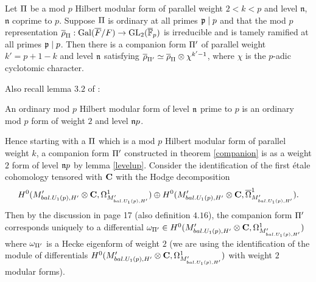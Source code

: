 \documentclass{amsart}
\newcommand{\ov}[1]{\overline{#1}}
\numberwithin{equation}{section}
\def \mb{\mbox}
\begin{document}
\begin{theorem}
\label{companion}
Let $\Pi$ be a mod $p$ Hilbert modular form of parallel weight $2<k<p$ and
level $\mathfrak{n}$, $\mathfrak{n}$ coprime to $p$. Suppose $\Pi$ is 
ordinary at all primes $\mathfrak{p} \mid p$ and that the mod $p$ representation
$\orho_\pip:\Gal(\overline{F}/F) \map \mb{GL}_{2}({\ov{\F}}_p)$ is irreducible
and is tamely ramified at all primes $\mathfrak{p} \mid p$. Then there is a 
companion form $\Pi'$ of parallel weight $k'=p+1-k$ and level $\mathfrak{n}$
satisfying $\ov{\rho}_{\pip'} \simeq \ov{\rho}_\pip \otimes \chi^{k'-1}$,
where $\chi$ is the $p$-adic cyclotomic character.
\end{theorem}

Also recall lemma $3.2$ of \cite{MR2357747}:

\begin{lemma}
\label{levelup}
An ordinary mod $p$ Hilbert modular form of level $\mathfrak{n}$ prime to $p$ is
an ordinary mod $p$ form of weight $2$ and level $\mathfrak{n}p$.
\end{lemma}

Hence starting with a $\Pi$ which is a mod $p$ Hilbert modular form of 
parallel weight $k$, a companion form $\Pi'$ constructed in theorem 
\ref{companion} is as a weight $2$ form of level $\mathfrak{n}p$ 
by lemma \ref{levelup}. 
Consider the identification of the first \'{e}tale
cohomology tensored with $\bold{C}$ with the Hodge decomposition 
$$H^0(\Mu  \otimes \bold{C},\Omega^1_{\Mu}) \oplus
H^0(\Mu \otimes \bold{C},\ov{\Omega}^1_{\Mu}).
$$
Then by the discussion in \cite{MR2357747} page 17 (also definition $4.16$), 
the companion form $\Pi'$ 
corresponds uniquely to a differential
$\omega_{\Pi'} \in H^0(M'_{bal.U_1(p),H'}  \otimes \bold{C},\Omega^1_{M'_{bal.U_1(p),H'}} )$ where
$\omega_{\Pi'}$ is a Hecke eigenform of weight $2$ (we are using the 
identification of the module of differentials 
$H^0(M'_{bal.U_1(p),H'}  \otimes \bold{C},\Omega^1_{M'_{bal.U_1(p),H'}})$
with weight $2$ modular forms).
\end{document}
